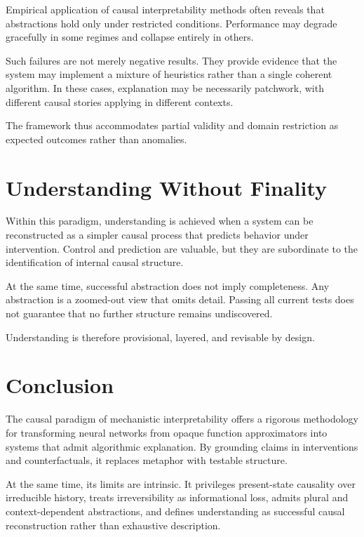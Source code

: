 \documentclass[11pt]{article}
\begin{document}
Empirical application of causal interpretability methods often reveals that abstractions hold only under restricted conditions. Performance may degrade gracefully in some regimes and collapse entirely in others.

Such failures are not merely negative results. They provide evidence that the system may implement a mixture of heuristics rather than a single coherent algorithm. In these cases, explanation may be necessarily patchwork, with different causal stories applying in different contexts.

The framework thus accommodates partial validity and domain restriction as expected outcomes rather than anomalies.

\section{Understanding Without Finality}

Within this paradigm, understanding is achieved when a system can be reconstructed as a simpler causal process that predicts behavior under intervention. Control and prediction are valuable, but they are subordinate to the identification of internal causal structure.

At the same time, successful abstraction does not imply completeness. Any abstraction is a zoomed-out view that omits detail. Passing all current tests does not guarantee that no further structure remains undiscovered.

Understanding is therefore provisional, layered, and revisable by design.

\section{Conclusion}

The causal paradigm of mechanistic interpretability offers a rigorous methodology for transforming neural networks from opaque function approximators into systems that admit algorithmic explanation. By grounding claims in interventions and counterfactuals, it replaces metaphor with testable structure.

At the same time, its limits are intrinsic. It privileges present-state causality over irreducible history, treats irreversibility as informational loss, admits plural and context-dependent abstractions, and defines understanding as successful causal reconstruction rather than exhaustive description.
\end{document}
